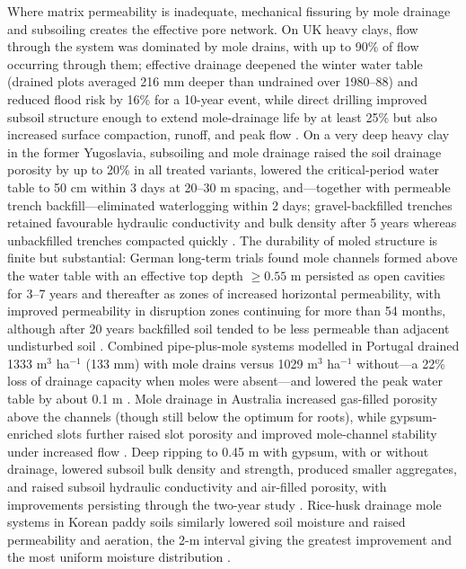 Where matrix permeability is inadequate, mechanical fissuring by mole drainage and
subsoiling creates the effective pore network. On UK heavy clays, flow through the
system was dominated by mole drains, with up to 90\% of flow occurring through them;
effective drainage deepened the winter water table (drained plots averaged 216 mm
deeper than undrained over 1980--88) and reduced flood risk by 16\% for a 10-year
event, while direct drilling improved subsoil structure enough to extend mole-drainage
life by at least 25\% but also increased surface compaction, runoff, and peak flow
\parencite{HARRIS1993}. On a very deep heavy clay in the former Yugoslavia, subsoiling
and mole drainage raised the soil drainage porosity by up to 20\% in all treated
variants, lowered the critical-period water table to 50 cm within 3 days at 20--30 m
spacing, and---together with permeable trench backfill---eliminated waterlogging
within 2 days; gravel-backfilled trenches retained favourable hydraulic conductivity
and bulk density after 5 years whereas unbackfilled trenches compacted quickly
\parencite{PLAMENAC1988}. The durability of moled structure is finite but
substantial: German long-term trials found mole channels formed above the water table
with an effective top depth $\geq 0.55$ m persisted as open cavities for 3--7 years
and thereafter as zones of increased horizontal permeability, with improved
permeability in disruption zones continuing for more than 54 months, although after 20
years backfilled soil tended to be less permeable than adjacent undisturbed soil
\parencite{MULLER1988}. Combined pipe-plus-mole systems modelled in Portugal drained
1333 m$^3$ ha$^{-1}$ (133 mm) with mole drains versus 1029 m$^3$ ha$^{-1}$ without---a
22\% loss of drainage capacity when moles were absent---and lowered the peak water
table by about 0.1 m \parencite{Castanheira2010}. Mole drainage in Australia increased
gas-filled porosity above the channels (though still below the optimum for roots),
while gypsum-enriched slots further raised slot porosity and improved mole-channel
stability under increased flow \parencite{Muirhead1996}. Deep ripping to 0.45 m with
gypsum, with or without drainage, lowered subsoil bulk density and strength, produced
smaller aggregates, and raised subsoil hydraulic conductivity and air-filled porosity,
with improvements persisting through the two-year study \parencite{Greenwood2006}.
Rice-husk drainage mole systems in Korean paddy soils similarly lowered soil moisture
and raised permeability and aeration, the 2-m interval giving the greatest improvement
and the most uniform moisture distribution \parencite{Jung2024}.


